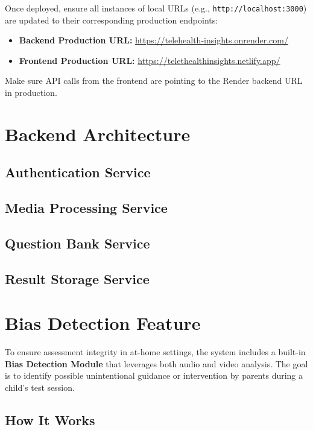 \documentclass{article}
\begin{document}
Once deployed, ensure all instances of local URLs (e.g., \texttt{http://localhost:3000}) are updated to their corresponding production endpoints:

\begin{itemize}
    \item \textbf{Backend Production URL:} \url{https://telehealth-insights.onrender.com/}
    \item \textbf{Frontend Production URL:} \url{https://telethealthinsights.netlify.app/}
\end{itemize}

Make sure API calls from the frontend are pointing to the Render backend URL in production.


\section{Backend Architecture}


\subsection{Authentication Service}
\subsection{Media Processing Service}
\subsection{Question Bank Service}
\subsection{Result Storage Service}

\section{Bias Detection Feature}

To ensure assessment integrity in at-home settings, the system includes a built-in \textbf{Bias Detection Module} that leverages both audio and video analysis. The goal is to identify possible unintentional guidance or intervention by parents during a child’s test session.

\subsection*{How It Works}
\end{document}
